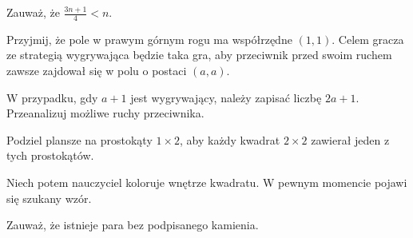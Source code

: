 
\begin{hints_list}
	\item Zauważ, że $\frac{3n + 1}{4} < n$.
	\item Przyjmij, że pole w prawym górnym rogu ma współrzędne $(1, 1)$. Celem gracza ze strategią wygrywająca będzie taka gra, aby przeciwnik przed swoim ruchem zawsze zajdował się w polu o postaci $(a, a)$.
	\item W przypadku, gdy $a + 1$ jest wygrywający, należy zapisać liczbę $2a + 1$. Przeanalizuj możliwe ruchy przeciwnika.
	\item Podziel plansze na prostokąty $1 \times 2$, aby każdy kwadrat $2 \times 2$ zawierał jeden z tych prostokątów.
	\item Niech potem nauczyciel koloruje wnętrze kwadratu. W pewnym momencie pojawi się szukany wzór.
	\item Zauważ, że istnieje para bez podpisanego kamienia. 
\end{hints_list}